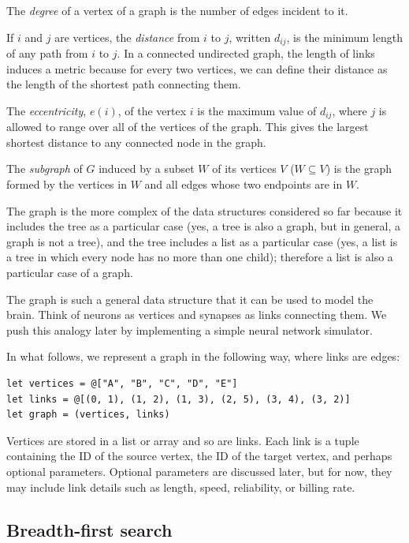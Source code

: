 \documentclass[justified, sixbynine]{tufte-book}
\theoremstyle{plain}%
\newtheorem * {corollary}{Corollary}
\theoremstyle{definition}
\theoremstyle{remark}
\newtheorem * {remark}{Remark}
\newtheorem * {note}{Note}
\begin{document}
\begin{fullwidth}

The {\it degree} of a vertex of a graph is the number of edges incident to
it.

If $i$ and $j$ are vertices, the {\it distance} from $i$ to $j$, written $%
d_{ij}$, is the minimum length of any path from $i$ to $j$. In a connected
undirected graph, the length of links induces a metric because for every two vertices, we can define their distance as the length of the shortest path connecting them.

The {\it eccentricity}, $e(i)$, of the vertex $i$ is the maximum value of $%
d_{ij}$, where $j$ is allowed to range over all of the vertices of the graph.  This gives the largest shortest distance to any connected node in the graph.

The {\it subgraph} of $G$ induced by a subset $W$ of its vertices $V$ ($%
W\subseteq V$) is the graph formed by the vertices in $W$ and all edges
whose two endpoints are in $W$.

The graph is the more complex of the data structures considered so far because it includes the tree as a particular case (yes, a tree is also a graph, but in general, a graph is not a tree), and the tree includes a list as a particular case (yes, a list is a tree in which every node has no more than one child); therefore a list is also a particular case of a graph.

The graph is such a general data structure that it can be used to model the brain. Think of neurons as vertices and synapses as links connecting them. We push this analogy later by implementing a simple neural network simulator.

In what follows, we represent a graph in the following way, where links are edges:

\begin{lstlisting}
let vertices = @["A", "B", "C", "D", "E"]
let links = @[(0, 1), (1, 2), (1, 3), (2, 5), (3, 4), (3, 2)]
let graph = (vertices, links)
\end{lstlisting}

Vertices are stored in a list or array and so are links. Each link is a tuple containing the ID of the source vertex, the ID of the target vertex, and perhaps optional parameters.  Optional parameters are discussed later, but for now, they may include link details such as length, speed, reliability, or billing rate.

\subsection{Breadth-first search}


\end{fullwidth}
\end{document}
